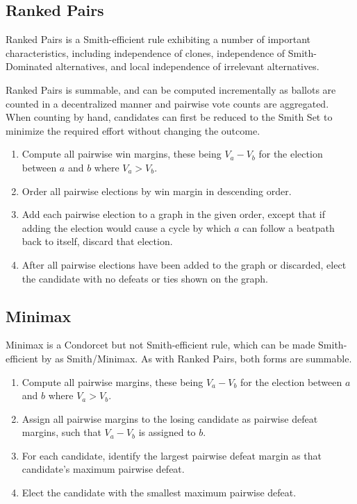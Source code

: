 \subsection{Ranked Pairs}

Ranked Pairs \autocite{Tideman1987} is a Smith-efficient rule exhibiting a number of important characteristics, including independence of clones, independence of Smith-Dominated alternatives, and local independence of irrelevant alternatives.

Ranked Pairs is summable, and can be computed incrementally as ballots are counted in a decentralized manner and pairwise vote counts are aggregated.  When counting by hand, candidates can first be reduced to the Smith Set to minimize the required effort without changing the outcome.

\begin{enumerate}
    \item Compute all pairwise win margins, these being $V_a-V_b$ for the election between $a$ and $b$ where $V_a>V_b$.

    \item Order all pairwise elections by win margin in descending order.

    \item Add each pairwise election to a graph in the given order, except that if adding the election would cause a cycle by which $a$ can follow a beatpath back to itself, discard that election.

    \item After all pairwise elections have been added to the graph or discarded, elect the candidate with no defeats or ties shown on the graph.
\end{enumerate}

\subsection{Minimax}

Minimax is a Condorcet but not Smith-efficient rule, which can be made Smith-efficient by as Smith/Minimax.  As with Ranked Pairs, both forms are summable.

\begin{enumerate}
    \item Compute all pairwise margins, these being $V_a-V_b$ for the election between $a$ and $b$ where $V_a>V_b$.

    \item Assign all pairwise margins to the losing candidate as pairwise defeat margins, such that $V_a-V_b$ is assigned to $b$.

    \item For each candidate, identify the largest pairwise defeat margin as that candidate's maximum pairwise defeat.

    \item Elect the candidate with the smallest maximum pairwise defeat.
\end{enumerate}

